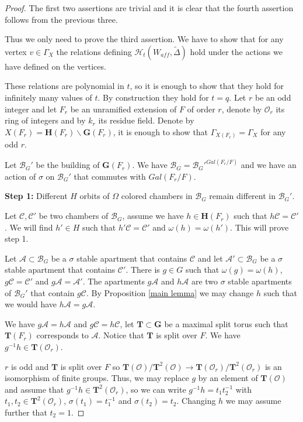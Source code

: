 \documentclass[12pt]{article}
\newcommand{\A}{\mathcal{A}}
\newcommand{\B}{\mathcal{B}}
\newcommand{\C}{\mathcal{C}}
\newcommand{\s}{\mathcal{O}}
\newcommand{\<}{\langle}
\renewcommand{\>}{\rangle}
\theoremstyle{plain}
\theoremstyle{definition}
\begin{document}
\begin{proof}
The first two assertions are trivial and it is clear that the fourth assertion follows from the previous three.

Thus we only need to prove the third assertion. We have to show that for any vertex $v\in \Gamma_X$ the relations defining $\mathcal{H}_{t}(W_{aff},\tilde{\Delta})$ hold under the actions we have defined on the vertices. 

These relations are polynomial in $t$, so it is enough to show that they hold for infinitely many values of $t$. By construction they hold for $t=q$. Let $r$ be an odd integer and let $F_r$ be an unramified extension of $F$ of order $r$, denote by $\s_r$ its ring of integers and by $k_r$ its residue field. Denote by $X(F_r)=\mathbf{H}(F_r)\backslash\mathbf{G}(F_r)$, it is enough to show that $\Gamma_{X(F_r)}=\Gamma_X$ for any odd $r$.

Let $\B_G'$ be the building of $\mathbf{G}(F_r)$. We have $\B_G=\B_G'^{Gal(F_r/F)}$ and we have an action of $\sigma$ on $\B_G'$ that commutes with $Gal(F_r/F)$. 

\textbf{Step 1:} Different $H$ orbits of $\Omega$ colored chambers in $\B_G$ remain different in $\B_G'$.

Let $\C,\C'$ be two chambers of $\B_G$, assume we have $h\in \mathbf{H}(F_r)$ such that $h\C=\C'$. We will find $h'\in H$ such that $h'\C=\C'$ and $\omega(h)=\omega(h')$. This will prove step 1.

Let $\A\subset \B_G$ be a $\sigma$ stable apartment that contains $\C$ and let $\A'\subset \B_G$ be a $\sigma$ stable apartment that contains $\C'$. There is $g\in G$ such that $\omega(g)=\omega(h)$, $g\C=\C'$ and $g\A=\A'$. The apartments $g\A$ and $h\A$ are two $\sigma$ stable apartments of $\B_G'$ that contain $g\C$. By Proposition \ref{main lemma} we may change $h$ such that we would have $h\A=g\A$.

We have $g\A=h\A$ and $g\C=h\C$, let $\mathbf{T}\subset \mathbf{G}$ be a maximal split torus such that $\mathbf{T}(F_r)$ corresponds to $\A$. Notice that $\mathbf{T}$ is split over $F$. We have $g^{-1}h\in \mathbf{T}(\s_r)$.

 $r$ is odd and $\mathbf{T}$ is split over $F$ so $\mathbf{T}(\s)/\mathbf{T}^2(\s)\rightarrow \mathbf{T}(\s_r)/\mathbf{T}^2(\s_r)$ is an isomorphism of finite groups. Thus, we may replace $g$ by an element of $\mathbf{T}(\s)$ and assume that $g^{-1}h\in \mathbf{T}^2(\s_r)$, so we can write $g^{-1}h=t_1t^{-1}_2$ with $t_1,t_2\in \mathbf{T}^2(\s_r)$, $\sigma(t_1)=t^{-1}_1$ and $\sigma(t_2)=t_2$. Changing $h$ we may assume further that $t_2=1$.


\end{proof}
\end{document}
